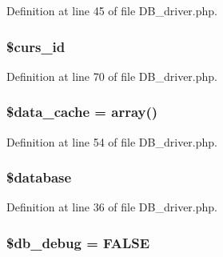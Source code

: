 Definition at line 45 of file D\-B\-\_\-driver.\-php.

\hypertarget{class_c_i___d_b__driver_a75e7d18ad2e68ace3813533c9da2e179}{
\subsubsection[{\$curs\-\_\-id}]{\setlength{\rightskip}{0pt plus 5cm}\$curs\-\_\-id}}\label{class_c_i___d_b__driver_a75e7d18ad2e68ace3813533c9da2e179}


Definition at line 70 of file D\-B\-\_\-driver.\-php.

\hypertarget{class_c_i___d_b__driver_aab3007e30adbaf71d06218aa6c90e384}{
\subsubsection[{\$data\-\_\-cache}]{\setlength{\rightskip}{0pt plus 5cm}\$data\-\_\-cache = array()}}\label{class_c_i___d_b__driver_aab3007e30adbaf71d06218aa6c90e384}


Definition at line 54 of file D\-B\-\_\-driver.\-php.

\hypertarget{class_c_i___d_b__driver_a7691c0162d89de0b6ba47edcd8ba8878}{
\subsubsection[{\$database}]{\setlength{\rightskip}{0pt plus 5cm}\$database}}\label{class_c_i___d_b__driver_a7691c0162d89de0b6ba47edcd8ba8878}


Definition at line 36 of file D\-B\-\_\-driver.\-php.

\hypertarget{class_c_i___d_b__driver_a2c1bc80cc98589e419a6c535e53735de}{
\subsubsection[{\$db\-\_\-debug}]{\setlength{\rightskip}{0pt plus 5cm}\$db\-\_\-debug = F\-A\-L\-S\-E}}\label{class_c_i___d_b__driver_a2c1bc80cc98589e419a6c535e53735de}


